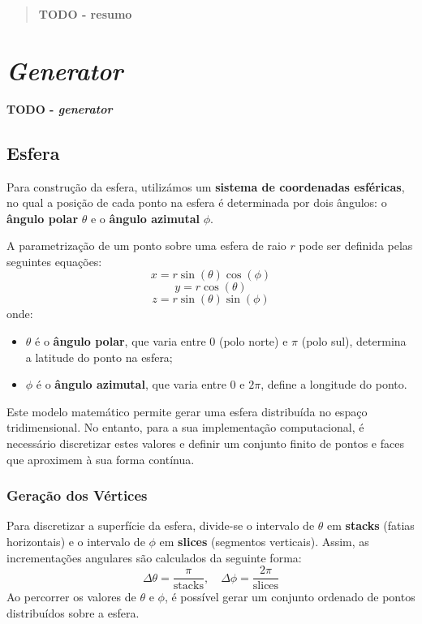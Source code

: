\documentclass[12pt, a4paper]{article}
\begin{document}
\pagebreak

\begin{abstract}
    \textbf{\color{red} TODO - resumo}
\end{abstract}

\section{\emph{Generator}}

\textbf{\color{red} TODO - \emph{generator}}

\subsection{Esfera}

Para construção da esfera, utilizámos um \textbf{sistema de coordenadas esféricas},
no qual a posição de cada ponto na esfera é determinada por dois ângulos: o
\textbf{ângulo polar} \( \theta \) e o \textbf{ângulo azimutal} \( \phi \).

A parametrização de um ponto sobre uma esfera de raio \( r \) pode ser definida pelas seguintes
equações:
\[
x = r \sin(\theta) \cos(\phi)
\]
\[
y = r \cos(\theta)
\]
\[
z = r \sin(\theta) \sin(\phi)
\]
onde:
\begin{itemize}
\item \( \theta \) é o \textbf{ângulo polar}, que varia entre \( 0 \) (polo norte) e \( \pi \)
(polo sul), determina a latitude do ponto na esfera;
\item \( \phi \) é o \textbf{ângulo azimutal}, que varia entre \( 0 \) e \( 2\pi \), define a
longitude do ponto.
\end{itemize}

Este modelo matemático permite gerar uma esfera distribuída no espaço tridimensional.
No entanto, para a sua implementação computacional, é necessário discretizar estes valores e
definir um conjunto finito de pontos e faces que aproximem à sua forma contínua.

\subsubsection{Geração dos Vértices}
Para discretizar a superfície da esfera, divide-se o intervalo de \( \theta \) em \textbf{stacks}
(fatias horizontais) e o intervalo de \( \phi \) em \textbf{slices} (segmentos verticais). Assim,
as incrementações angulares são calculados da seguinte forma:
\[
\Delta\theta = \frac{\pi}{\text{stacks}}, \quad \Delta\phi = \frac{2\pi}{\text{slices}}
\]
Ao percorrer os valores de \( \theta \) e \( \phi \), é possível gerar um conjunto ordenado
de pontos distribuídos sobre a esfera.
\end{document}
